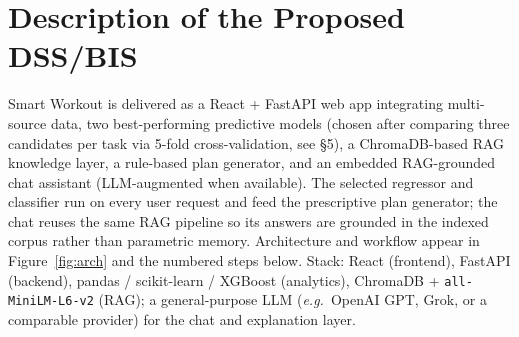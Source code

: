 \documentclass[10pt,a4paper]{article}
\begin{document}
\section{Description of the Proposed DSS/BIS}
Smart Workout is delivered as a React + FastAPI web app integrating multi-source data, two best-performing predictive models (chosen after comparing three candidates per task via 5-fold cross-validation, see \S5), a ChromaDB-based RAG knowledge layer, a rule-based plan generator, and an embedded RAG-grounded chat assistant (LLM-augmented when available). The selected regressor and classifier run on every user request and feed the prescriptive plan generator; the chat reuses the same RAG pipeline so its answers are grounded in the indexed corpus rather than parametric memory. Architecture and workflow appear in Figure~\ref{fig:arch} and the numbered steps below. Stack: React (frontend), FastAPI (backend), pandas / scikit-learn / XGBoost (analytics), ChromaDB + \texttt{all-MiniLM-L6-v2} (RAG); a general-purpose LLM (\emph{e.g.}\ OpenAI GPT, Grok, or a comparable provider) for the chat and explanation layer.
\end{document}

